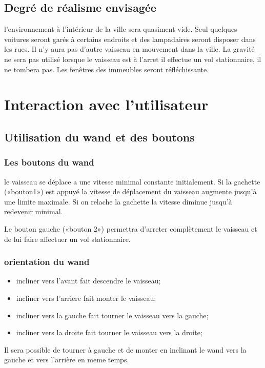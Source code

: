 \documentclass[a4paper,11pt]{article}
\begin{document}
\subsection{Degré de réalisme envisagée}

l'environnement à l'intérieur de la ville sera quasiment vide. Seul quelques voitures seront garés à certains endroits et des lampadaires seront disposer dans les rues. Il n'y aura pas d'autre vaisseau en mouvement dans la ville. La gravité ne sera pas utilisé lorsque le vaisseau est à l'arret il effectue un vol stationnaire, il ne tombera pas. Les fenêtres des immeubles seront réfléchissante.
 
\section{Interaction avec l'utilisateur}
\subsection{Utilisation du wand et des boutons}
\subsubsection{Les boutons du wand}
le vaisseau se déplace a une vitesse minimal constante initialement. Si la gachette («bouton1») est appuyé la vitesse de déplacement du vaisseau augmente jusqu'à une limite maximale. Si on relache la gachette la vitesse diminue
jusqu'à redevenir minimal.

Le bouton gauche («bouton 2») permettra d'arreter complètement le vaisseau et de lui faire affectuer un vol stationnaire.

 
\subsubsection{orientation du wand}
\begin{itemize}
\item incliner vers l'avant fait descendre le vaisseau;
\item incliner vers l'arriere fait monter le vaisseau;
\item incliner vers la gauche fait tourner le vaisseau vers la gauche;
\item incliner vers la droite fait tourner le vaisseau vers la droite;
\end{itemize}

Il sera possible de tourner à gauche et de monter en inclinant le wand vers la gauche et vers l'arrière en meme temps.
\end{document}
